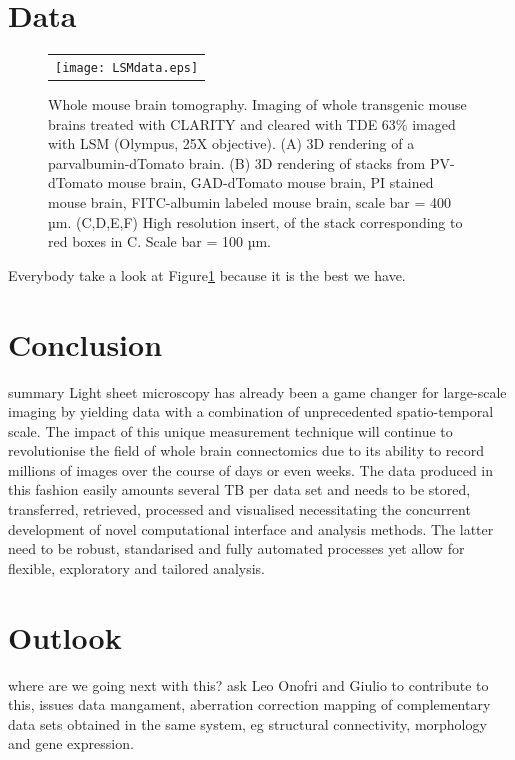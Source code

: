 \documentclass[12pt]{spieman}  %
\begin{document}
\section{Data}

	\begin{figure}
   \begin{center}
   \begin{tabular}{c}
   \texttt{[image: LSMdata.eps]}
   \end{tabular}
   \end{center}
   \caption{\label{fig:LSMdata} Whole mouse brain tomography. Imaging of whole transgenic mouse brains treated with CLARITY and cleared with TDE 63\% imaged with LSM (Olympus, 25X objective). (A) 3D rendering of a parvalbumin-dTomato brain. (B) 3D rendering of stacks from PV-dTomato mouse brain, GAD-dTomato mouse brain,  PI stained mouse brain, FITC-albumin labeled mouse brain, scale bar = 400 µm. (C,D,E,F) High resolution insert, of the stack corresponding to red boxes in C. Scale bar = 100 µm.} 
   \end{figure}
	
	Everybody take a look at Figure\ref{fig:LSMdata} because it is the best we have. 

\section{Conclusion}
summary
Light sheet microscopy has already been a game changer for large-scale imaging by yielding data with a combination of unprecedented spatio-temporal scale. The impact of this unique measurement technique will continue to revolutionise the field of whole brain connectomics due to its ability to record millions of images over the course of days or even weeks. The data produced in this fashion easily amounts several TB per data set and needs to be stored, transferred, retrieved, processed and visualised necessitating the concurrent development of novel computational interface and analysis methods. The latter need to be robust, standarised and fully automated processes yet allow for flexible, exploratory and tailored analysis. 

\section{Outlook}
where are we going next with this? ask Leo Onofri and Giulio to contribute to this, issues data mangament, aberration correction
mapping of complementary data sets obtained in the same system, eg structural connectivity, morphology and gene expression. 
\end{document}
